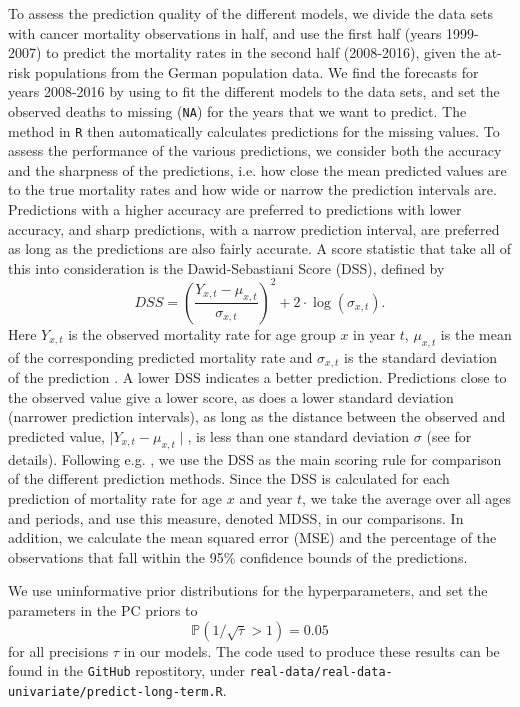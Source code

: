 \newpar To assess the prediction quality of the different models, we divide the data sets with cancer mortality observations in half, and use the first half (years 1999-2007) to predict the mortality rates in the second half (2008-2016), given the at-risk populations from the German population data. We find the forecasts for years 2008-2016 by using \inlabru to fit the different models to the data sets, and set the observed deaths to missing (\texttt{NA}) for the years that we want to predict. The \inlabru method in \texttt{R} then automatically calculates predictions for the missing values. 
To assess the performance of the various predictions, we consider both the accuracy and the sharpness of the predictions, i.e. how close the mean predicted values are to the true mortality rates and how wide or narrow the prediction intervals are. Predictions with a higher accuracy are preferred to predictions with lower accuracy, and sharp predictions, with a narrow prediction interval, are preferred as long as the predictions are also fairly accurate. A score statistic that take all of this into consideration is the Dawid-Sebastiani Score (DSS), defined by 
\begin{equation}
    DSS = (\frac{Y_{x,t} - \mu_{x,t}}{\sigma_{x,t}})^2 + 2\cdot \log(\sigma_{x,t}).
\end{equation}
Here $Y_{x,t}$ is the observed mortality rate for age group $x$ in year $t$, $\mu_{x,t}$ is the mean of the corresponding predicted mortality rate and $\sigma_{x,t}$ is the standard deviation of the prediction \parencite{Gneiting2007}. A lower DSS indicates a better prediction. Predictions close to the observed value give a lower score, as does a lower standard deviation (narrower prediction intervals), as long as the distance between the observed and predicted value, $\mid Y_{x,t} - \mu_{x,t} \mid$, is less than one standard deviation $\sigma$ (see \textcite{Keilman2020} for details). Following e.g. \textcite{RieblerHeldRue2012}, we use the DSS as the main scoring rule for comparison of the different prediction methods. Since the DSS is calculated for each prediction of mortality rate for age $x$ and year $t$, we take the average over all ages and periods, and use this measure, denoted MDSS, in our comparisons. In addition, we calculate the mean squared error (MSE) and the percentage of the observations that fall within the 95\% confidence bounds of the predictions.

\newpar We use uninformative prior distributions for the hyperparameters, and set the parameters in the PC priors to
\begin{equation*}
    \mathbb{P}(1/\sqrt{\tau} > 1) = 0.05
\end{equation*}
for all precisions $\tau$ in our models. The code used to produce these results can be found in the \texttt{GitHub} repostitory, under \texttt{real-data/real-data-univariate/predict-long-term.R}. 

